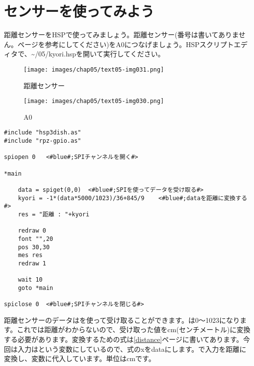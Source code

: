 \newpage
\section{センサーを使ってみよう}
距離センサーをHSPで使ってみましょう。距離センサー(番号は書いてありません。\pageref{distance}ページを参考にしてください)をA0につなげましょう。HSPスクリプトエディタで、\textasciitilde /05/kyori.hspを開いて実行してください。
\begin{center}
  \begin{minipage}[t]{.3\columnwidth}
    \begin{figure}[H]
      \centering
      \texttt{[image: images/chap05/text05-img031.png]}
      \caption{距離センサー}
    \end{figure}
  \end{minipage}
  \begin{minipage}[t]{.5\columnwidth}
    \begin{figure}[H]
    \centering
    \texttt{[image: images/chap05/text05-img030.png]}
    \caption{A0}
    \end{figure}
  \end{minipage}
\end{center}
\begin{lstlisting}[caption=kyori.hsp,label=kyori.hsp]
#include "hsp3dish.as"
#include "rpz-gpio.as"

spiopen 0	<#blue#;SPIチャンネルを開く#>

*main

	data = spiget(0,0)	<#blue#;SPIを使ってデータを受け取る#>
	kyori = -1*(data*5000/1023)/36+845/9	<#blue#;dataを距離に変換する#>
	res = "距離 : "+kyori
	
	redraw 0
	font "",20
	pos 30,30
	mes res
	redraw 1

	wait 10
	goto *main

spiclose 0	<#blue#;SPIチャンネルを閉じる#>
\end{lstlisting}

距離センサーのデータはを使って受け取ることができます。は0～1023になります。これでは距離がわからないので、受け取った値をcm(センチメートル)に変換する必要があります。変換するための式は\ref{distance}ページに書いてあります。今回は入力はという変数にしているので、式のxをdataにします。で入力を距離に変換し、変数に代入しています。単位はcmです。\\

\begin{tcolorbox}[title=\useOmetoi]
\begin{enumerate}
\end{enumerate}
\end{tcolorbox}
